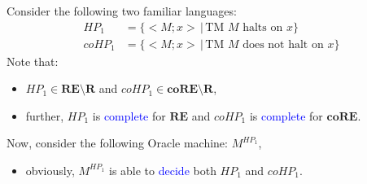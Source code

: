 \documentclass{beamer}
\newcommand{\REcl}{\mathsf{\mathbf{RE}}}
\newcommand{\coREcl}{\mathsf{\mathbf{coRE}}}
\newcommand{\Rcl}{\mathsf{\mathbf{R}}}
\newcommand{\HP}{\mathit{HP}}
\newcommand{\coHP}{\mathit{coHP}}
\newcommand{\st}{\,|\,}
\newcommand{\hlbl}[1]{\textcolor{blue}{#1}}
\begin{document}
\begin{frame}
  \frametitle{\insertsubsection}
  Consider the following two familiar languages:
  \begin{align*}
      \HP_1 &= \{<\!M;x\!> \st \mbox{TM $M$ halts on $x$}\} \\
    \coHP_1 &= \{<\!M;x\!> \st \mbox{TM $M$ does not halt on $x$}\}
  \end{align*}
  \vspace{3mm}
  Note that:
  \begin{itemize}
    \item  $\HP_1 \in \REcl \setminus \Rcl$ and $\coHP_1 \in \coREcl \setminus
      \Rcl$,
    \item  further, $\HP_1$ is \hlbl{complete} for $\REcl$ and $\coHP_1$ is
      \hlbl{complete} for $\coREcl$.
  \end{itemize}
  \vspace{5mm}
  \pause
  Now, consider the following Oracle machine: $M^{\HP_1}$,
  \begin{itemize}
    \item  obviously, $M^{\HP_1}$ is able to \hlbl{decide} both $\HP_1$ and
      $\coHP_1$.
  \end{itemize}
\end{frame}
\end{document}
